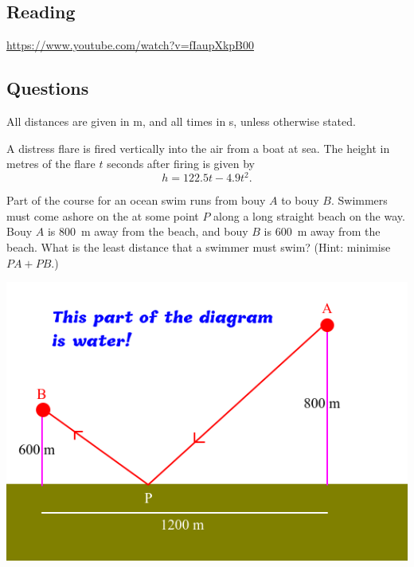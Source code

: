 


\subsection*{Reading}
\begin{center}
\begin{tcolorbox}[width=0.8\textwidth,colback={red},title={\textbf{Go and watch...}},colbacktitle=yellow,coltitle=blue]
  \textcolor{white}{\url{https://www.youtube.com/watch?v=fIaupXkpB00}}
\end{tcolorbox}
\end{center}

\subsection*{Questions}
All distances are given in \si{\metre}, and all times in \si{\second}, unless otherwise stated.
\begin{questions}
  \question A distress flare is fired vertically into the air from a boat at sea. The height in metres of the flare $ t $ seconds
            after firing is given by
            \begin{displaymath}
              h = 122.5t - 4.9t^2.
            \end{displaymath}
  \question Part of the course for an ocean swim runs from bouy $ A $ to bouy $ B $. Swimmers must come ashore
            on the at some point $ P $ along a long straight beach on the way. Bouy $ A $ is \SI{800}{\metre} away
            from the beach, and bouy $ B $ is \SI{600}{\metre} away from the beach. What is the least distance that
            a swimmer must swim? (Hint: minimise $ PA + PB $.)
            \begin{center}
              \includegraphics[width=0.5\linewidth]{bouys}
            \end{center}
\end{questions}


